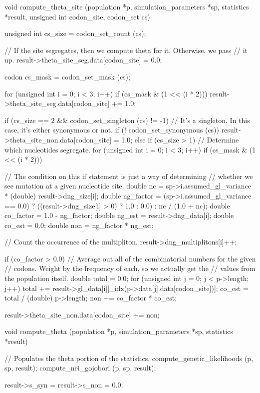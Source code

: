 \documentclass{article}
\begin{document}
\begin{ccode}
void compute_theta_site (population *p, simulation_parameters *sp, statistics *result,
			 unsigned int codon_site, codon_set cs) {
  unsigned int cs_size = codon_set_count (cs);

  // If the site segregates, then we compute theta for it. Otherwise, we pass
  // it up.
  result->theta_site_seg.data[codon_site] = 0.0;

  codon cs_mask = codon_set_mask (cs);

  for (unsigned int i = 0; i < 3; i++)
    if (cs_mask & (1 << (i * 2)))
      result->theta_site_seg.data[codon_site] += 1.0;

  if (cs_size == 2 && codon_set_singleton (cs) != -1) {
    // It's a singleton. In this case, it's either synonymous or not.
    if (! codon_set_synonymous (cs))
      result->theta_site_non.data[codon_site] = 1.0;
  } else if (cs_size > 1)
    // Determine which nucleotides segregate.
    for (unsigned int i = 0; i < 3; i++)
      if (cs_mask & (1 << (i * 2))) {
	// The condition on this if statement is just a way of determining
	// whether we see mutation at a given nucleotide site.
	double nc        = sp->i.assumed_gl_variance * (double) result->dng_size[i];
	double ng_factor = (sp->i.assumed_gl_variance == 0.0) ?
			     ((result->dng_size[i] > 0) ? 1.0 : 0.0) :
			     nc / (1.0 + nc);
	double co_factor = 1.0 - ng_factor;
	double ng_est    = result->dng_data[i];
	double co_est    = 0.0;
	double non       = ng_factor * ng_est;

	// Count the occurrence of the multipliton.
	result->dng_multiplitons[i]++;

	if (co_factor > 0.0) {
	  // Average out all of the combinatorial numbers for the given
	  // codons. Weight by the frequency of each, so we actually get the
	  // values from the population itself.
	  double total = 0.0;
	  for (unsigned int j = 0; j < p->length; j++)
	    total += result->gl_data[i][_idx(p->data[j].data[codon_site])];
	  co_est = total / (double) p->length;
	  non += co_factor * co_est;
	}

	result->theta_site_non.data[codon_site] += non;
      }
}

void compute_theta (population *p, simulation_parameters *sp, statistics *result) {
  // Populates the theta portion of the statistics.
  compute_genetic_likelihoods (p, sp, result);
  compute_nei_gojobori (p, sp, result);
  
  result->s_syn = result->s_non = 0.0;

}
\end{ccode}
\end{document}

